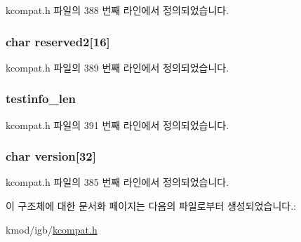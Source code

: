 kcompat.\+h 파일의 388 번째 라인에서 정의되었습니다.

\subsubsection[{\texorpdfstring{reserved2}{reserved2}}]{\setlength{\rightskip}{0pt plus 5cm}char reserved2\mbox{[}16\mbox{]}}\hypertarget{structk__ethtool__drvinfo_a523d14f136475fa10dcd5857826b604a}{}\label{structk__ethtool__drvinfo_a523d14f136475fa10dcd5857826b604a}


kcompat.\+h 파일의 389 번째 라인에서 정의되었습니다.

\subsubsection[{\texorpdfstring{testinfo\+\_\+len}{testinfo_len}}]{ testinfo\+\_\+len}\hypertarget{structk__ethtool__drvinfo_a25068122b5d9b16cbe764bf7bbce5599}{}\label{structk__ethtool__drvinfo_a25068122b5d9b16cbe764bf7bbce5599}


kcompat.\+h 파일의 391 번째 라인에서 정의되었습니다.

\subsubsection[{\texorpdfstring{version}{version}}]{\setlength{\rightskip}{0pt plus 5cm}char version\mbox{[}32\mbox{]}}\hypertarget{structk__ethtool__drvinfo_ab7531ce77b74db0a0cd64c1ab1f69e72}{}\label{structk__ethtool__drvinfo_ab7531ce77b74db0a0cd64c1ab1f69e72}


kcompat.\+h 파일의 385 번째 라인에서 정의되었습니다.



이 구조체에 대한 문서화 페이지는 다음의 파일로부터 생성되었습니다.\+:\begin{DoxyCompactItemize}
\item 
kmod/igb/\hyperlink{kcompat_8h}{kcompat.\+h}\end{DoxyCompactItemize}
